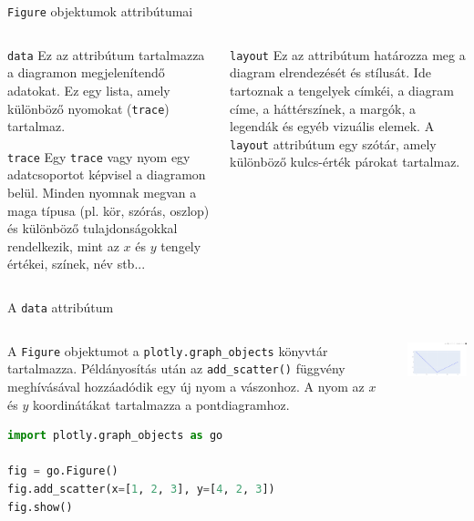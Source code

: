 \documentclass[english, aspectratio=169]{beamer}
\begin{document}
	\begin{frame}{\texttt{Figure} objektumok attribútumai}
		\begin{columns}
			\begin{column}{.5\textwidth}
				\begin{block}{\texttt{data}}
					 Ez az attribútum tartalmazza a diagramon megjelenítendő adatokat. Ez egy lista, amely különböző nyomokat (\texttt{trace}) tartalmaz.
				\end{block}
				\vspace{.3cm}
				\begin{block}{\texttt{trace}}
					Egy \texttt{trace} vagy nyom egy adatcsoportot képvisel a diagramon belül. Minden nyomnak megvan a maga típusa (pl. kör, szórás, oszlop) és különböző tulajdonságokkal rendelkezik, mint az $x$ és $y$ tengely értékei, színek, név stb...
				\end{block}
			\end{column}
			\begin{column}{.5\textwidth}
				\begin{block}{\texttt{layout}}
					Ez az attribútum határozza meg a diagram elrendezését és stílusát. Ide tartoznak a tengelyek címkéi, a diagram címe, a háttérszínek, a margók, a legendák és egyéb vizuális elemek. A \texttt{layout} attribútum egy szótár, amely különböző kulcs-érték párokat tartalmaz.
				\end{block}
			\end{column}
		\end{columns}
	\end{frame}
	
	\begin{frame}[fragile]{A \texttt{data} attribútum}
		\begin{columns}
			\begin{column}{.6\textwidth}
				A \texttt{Figure} objektumot a \texttt{plotly.graph\_objects} könyvtár tartalmazza. Példányosítás után az \texttt{add\_scatter()} függvény meghívásával hozzáadódik egy új nyom a vászonhoz. A nyom az $x$ és $y$ koordinátákat tartalmazza a pontdiagramhoz. 
				\vspace*{0.3cm}
				\begin{lstlisting}[language=python]
import plotly.graph_objects as go

fig = go.Figure()
fig.add_scatter(x=[1, 2, 3], y=[4, 2, 3])
fig.show()
				\end{lstlisting}		
			\end{column}
			\begin{column}{.4\textwidth}
				\begin{center}
					\includegraphics[width=6cm, keepaspectratio]{images/plots_2.png}
				\end{center}
			\end{column}
		\end{columns}
	\end{frame}
	
\end{document}
